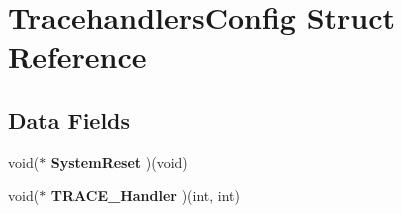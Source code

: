 \hypertarget{struct_tracehandlers_config}{}\section{Tracehandlers\+Config Struct Reference}
\label{struct_tracehandlers_config}
\subsection*{Data Fields}
\begin{DoxyCompactItemize}
\item 
\hypertarget{struct_tracehandlers_config_a8a207cd3094ad3179b990c1dd4be8417}{}\label{struct_tracehandlers_config_a8a207cd3094ad3179b990c1dd4be8417} 
void($\ast$ {\bfseries System\+Reset} )(void)
\item 
\hypertarget{struct_tracehandlers_config_a79e207c44e3900ab7c4140f6bbdf0c19}{}\label{struct_tracehandlers_config_a79e207c44e3900ab7c4140f6bbdf0c19} 
void($\ast$ {\bfseries T\+R\+A\+C\+E\+\_\+\+Handler} )(int, int)
\end{DoxyCompactItemize}
